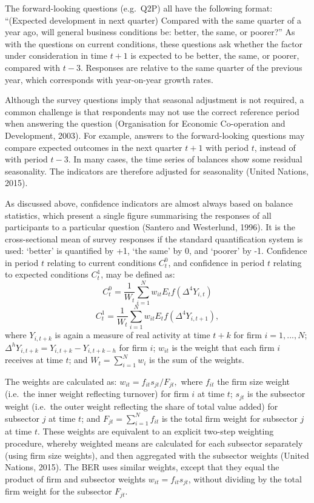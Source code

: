 \documentclass[11pt,]{article}
\begin{document}
The forward-looking questions (e.g.~Q2P) all have the following format:
``(Expected development in next quarter) Compared with the same quarter
of a year ago, will general business conditions be: better, the same, or
poorer?'' As with the questions on current conditions, these questions
ask whether the factor under consideration in time \(t+1\) is expected
to be better, the same, or poorer, compared with \(t-3\). Responses are
relative to the same quarter of the previous year, which corresponds
with year-on-year growth rates.

Although the survey questions imply that seasonal adjustment is not
required, a common challenge is that respondents may not use the correct
reference period when answering the question (Organisation for Economic
Co-operation and Development, 2003). For example, answers to the
forward-looking questions may compare expected outcomes in the next
quarter \(t+1\) with period \(t\), instead of with period \(t-3\). In
many cases, the time series of balances show some residual seasonality.
The indicators are therefore adjusted for seasonality (United Nations,
2015).

As discussed above, confidence indicators are almost always based on
balance statistics, which present a single figure summarising the
responses of all participants to a particular question (Santero and
Westerlund, 1996). It is the cross-sectional mean of survey responses if
the standard quantification system is used: `better' is quantified by
+1, `the same' by 0, and `poorer' by -1. Confidence in period \(t\)
relating to current conditions \(C_t^{0}\), and confidence in period
\(t\) relating to expected conditions \(C_t^{1}\), may be defined as:
\[C^{0}_t = \frac{1}{W_t} \sum^N_{i=1} w_{it} E_t f(\Delta^4 Y_{i,t })\]
\[C^{1}_t = \frac{1}{W_t} \sum^N_{i=1} w_{it} E_t f(\Delta^4 Y_{i,t+1}) ,\]
where \(Y_{i,t+k}\) is again a measure of real activity at time \(t+k\)
for firm \(i = 1,...,N\);
\(\Delta^h Y_{i,t+k} = Y_{i,t+k} - Y_{i,t+k-h}\) for firm \(i\);
\(w_{it}\) is the weight that each firm \(i\) receives at time \(t\);
and \(W_{t} = \sum^N_{i=1}w_i\) is the sum of the weights.

The weights are calculated as: \(w_{it} = f_{it} s_{jt} / F_{jt} ,\)
where \(f_{it}\) the firm size weight (i.e.~the inner weight reflecting
turnover) for firm \(i\) at time \(t\); \(s_{jt}\) is the subsector
weight (i.e.~the outer weight reflecting the share of total value added)
for subsector \(j\) at time \(t\); and \(F_{jt} = \sum^N_{i=1} f_{it}\)
is the total firm weight for subsector \(j\) at time \(t\). These
weights are equivalent to an explicit two-step weighting procedure,
whereby weighted means are calculated for each subsector separately
(using firm size weights), and then aggregated with the subsector
weights (United Nations, 2015). The BER uses similar weights, except
that they equal the product of firm and subsector weights
\(w_{it} = f_{it} s_{jt}\), without dividing by the total firm weight
for the subsector \(F_{jt}\).
\end{document}
